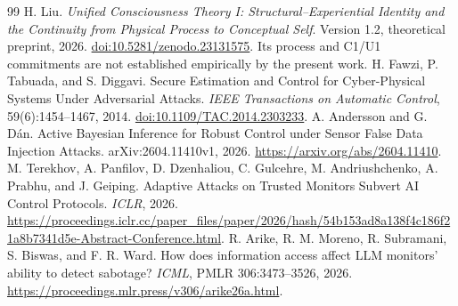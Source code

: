 \documentclass[11pt,a4paper]{article}
\theoremstyle{definition}\newtheorem{definition}{Definition}
\begin{document}
\begin{thebibliography}{99}
 H. Liu. \emph{Unified Consciousness Theory I: Structural--Experiential Identity and the Continuity from Physical Process to Conceptual Self}. Version 1.2, theoretical preprint, 2026. \href{https://doi.org/10.5281/zenodo.23131575}{doi:10.5281/zenodo.23131575}. Its process and C1/U1 commitments are not established empirically by the present work.
 H. Fawzi, P. Tabuada, and S. Diggavi. Secure Estimation and Control for Cyber-Physical Systems Under Adversarial Attacks. \emph{IEEE Transactions on Automatic Control}, 59(6):1454--1467, 2014. \href{https://doi.org/10.1109/TAC.2014.2303233}{doi:10.1109/TAC.2014.2303233}.
 A. Andersson and G. D\'an. Active Bayesian Inference for Robust Control under Sensor False Data Injection Attacks. arXiv:2604.11410v1, 2026. \url{https://arxiv.org/abs/2604.11410}.
 M. Terekhov, A. Panfilov, D. Dzenhaliou, C. Gulcehre, M. Andriushchenko, A. Prabhu, and J. Geiping. Adaptive Attacks on Trusted Monitors Subvert AI Control Protocols. \emph{ICLR}, 2026. \url{https://proceedings.iclr.cc/paper_files/paper/2026/hash/54b153ad8a138f4c186f21a8b7341d5e-Abstract-Conference.html}.
 R. Arike, R. M. Moreno, R. Subramani, S. Biswas, and F. R. Ward. How does information access affect LLM monitors' ability to detect sabotage? \emph{ICML}, PMLR 306:3473--3526, 2026. \url{https://proceedings.mlr.press/v306/arike26a.html}.
\end{thebibliography}
\end{document}
